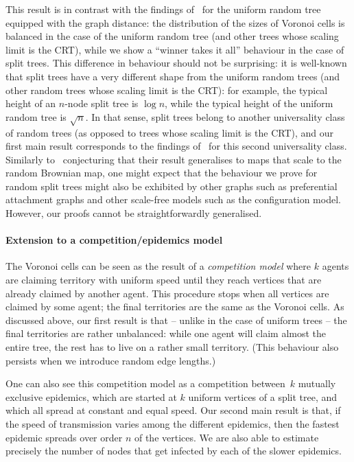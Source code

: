 \documentclass[AHL,Unicode,longabstracts,published]{cedram}
\begin{document}
This result is in contrast with the findings of~\cite{Chapuy} for the uniform random tree equipped with the graph distance: the distribution of the sizes of Voronoi cells is balanced in the case of the uniform random tree (and other trees whose scaling limit is the CRT), while we show a ``winner takes it all'' behaviour in the case of split trees. This difference in behaviour should not be surprising: it is well-known that split trees have a very different shape from the uniform random trees (and other random trees whose scaling limit is the CRT): for example, the typical height of an $n$-node split tree is $\log n$, while the typical height of the uniform random tree is $\sqrt n$. In that sense, split trees belong to another universality class of random trees (as opposed to trees whose scaling limit is the CRT), and our first main result corresponds to the findings of~\cite{Chapuy} for this second universality class. Similarly to~\cite{Chapuy} conjecturing that their result generalises to maps that scale to the random Brownian map, one might expect that the behaviour we prove for random split trees might also be exhibited by other graphs such as preferential attachment graphs and other scale-free models such as the configuration model. However, our proofs cannot be straightforwardly generalised.

\paragraph*{Extension to a competition/epidemics model}
The Voronoi cells can be seen as the result of a \emph{competition model} where $k$ agents are claiming territory with uniform speed until they reach vertices that are already claimed by another agent. This procedure stops when all vertices are claimed by some agent; the final territories are the same as the Voronoi cells. As discussed above, our first result is that -- unlike in the case of uniform trees -- the final territories are rather unbalanced: while one agent will claim almost the entire tree, the rest has to live on a rather small territory. (This behaviour also persists when we introduce random edge lengths.)

One can also see this competition model as a competition between~$k$ mutually exclusive epidemics, which are started at $k$ uniform vertices of a split tree, and which all spread at constant and equal speed. Our second main result is that, if the speed of transmission varies among the different epidemics, then the fastest epidemic spreads over order $n$ of the vertices. We are also able to estimate precisely the number of nodes that get infected by each of the slower epidemics.
\end{document}
